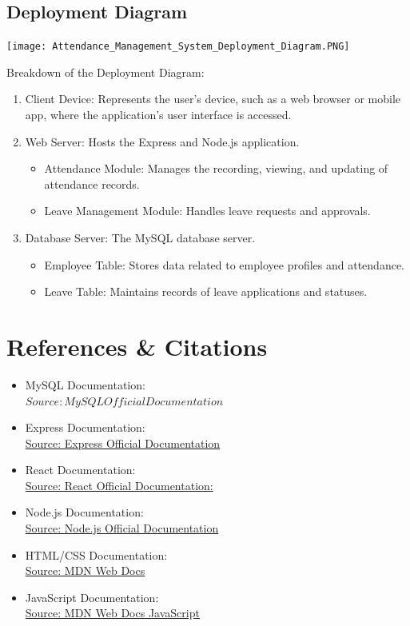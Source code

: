 \documentclass[a4paper, 12pt]{article}
\begin{document}
\subsection{Deployment Diagram}
\begin{center}
\texttt{[image: Attendance\_Management\_System\_Deployment\_Diagram.PNG]}\par
\end{center}
Breakdown of the Deployment Diagram:
\begin{enumerate}
    \item Client Device: Represents the user’s device, such as a web browser or mobile app, where the application’s user interface is accessed.
    \item Web Server: Hosts the Express and Node.js application.
    \begin{itemize}
        \item Attendance Module: Manages the recording, viewing, and updating of attendance records.
        \item Leave Management Module: Handles leave requests and approvals.
    \end{itemize}
    \item Database Server: The MySQL database server.
    \begin{itemize}
        \item Employee Table: Stores data related to employee profiles and attendance.
        \item Leave Table: Maintains records of leave applications and statuses.
    \end{itemize}
\end{enumerate}

\newpage
\section{References \& Citations}
\begin{itemize}
    \item MySQL Documentation:\\
    \href{https://dev.mysql.com/doc/}{$Source: MySQL Official Documentation$}
    \item Express Documentation:\\
    \href{http://expressjs.com/}{Source: Express Official Documentation}
    \item React Documentation:\\
    \href{https://legacy.reactjs.org/}{Source: React Official Documentation:}
    \item Node.js Documentation:\\
    \href{https://nodejs.org/en/docs}{Source: Node.js Official Documentation}
    \item HTML/CSS Documentation:\\
    \href{https://developer.mozilla.org/en-US/}{Source: MDN Web Docs}
    \item JavaScript Documentation:\\
    \href{https://developer.mozilla.org/en-US/docs/Web/javascript}{Source: MDN Web Docs JavaScript}
\end{itemize}
\end{document}
